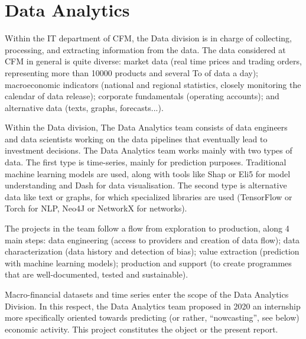 \section{Data Analytics}
\label{chapter1_section2}

Within the IT department of CFM, the Data division is in charge of collecting, processing, and extracting information from the data. The data considered at CFM in general is quite diverse: market data (real time prices and trading orders, representing more than 10000 products and several To of data a day); macroeconomic indicators (national and regional statistics, closely monitoring the calendar of data release); corporate fundamentals (operating accounts); and alternative data (texts, graphs, forecasts...).

Within the Data division, The Data Analytics team consists of data engineers and data scientists working on the data pipelines that eventually lead to investment decisions. The Data Analytics team works mainly with two types of data. The first type is time-series, mainly for prediction purposes. Traditional machine learning models are used, along with tools like Shap or Eli5 for model understanding and Dash for data visualisation. The second type is alternative data like text or graphs, for which specialized libraries are used (TensorFlow or Torch for NLP, Neo4J or NetworkX for networks).

The projects in the team follow a flow from exploration to production, along 4 main steps: data engineering (access to providers and creation of data flow); data characterization (data history and detection of bias); value extraction (prediction with machine learning models); production and support (to create programmes that are well-documented, tested and sustainable).

Macro-financial datasets and time series enter the scope of the Data Analytics Division. In this respect, the Data Analytics team proposed in 2020 an internship more specifically oriented towards predicting (or rather, ``nowcasting'', see below) economic activity. This project constitutes the object or the present report.


